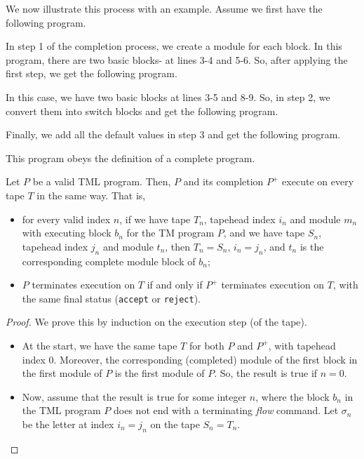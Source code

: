 \begin{appendices}
We now illustrate this process with an example. Assume we first have the following program.

In step 1 of the completion process, we create a module for each block. In this program, there are two basic blocks- at lines 3-4 and 5-6. So, after applying the first step, we get the following program.

In this case, we have two basic blocks at lines 3-5 and 8-9. So, in step 2, we convert them into switch blocks and get the following program.

Finally, we add all the default values in step 3 and get the following program.

This program obeys the definition of a complete program.

\begin{theorem} \label{thm:complete_TM}
    Let $P$ be a valid TML program. Then, $P$ and its completion $P^+$ execute on every tape $T$ in the same way. That is,
    \begin{itemize}
        \item for every valid index $n$, if we have tape $T_n$, tapehead index $i_n$ and module $m_n$ with executing block $b_n$ for the TM program $P$, and we have tape $S_n$, tapehead index $j_n$ and module $t_n$, then $T_n = S_n$, $i_n = j_n$, and $t_n$ is the corresponding complete module block of $b_n$;
        \item $P$ terminates execution on $T$ if and only if $P^+$ terminates execution on $T$, with the same final status (\texttt{accept} or \texttt{reject}).
    \end{itemize}
\end{theorem}
\begin{proof}
    We prove this by induction on the execution step (of the tape). 
    \begin{itemize}
        \item At the start, we have the same tape $T$ for both $P$ and $P^+$, with tapehead index 0. Moreover, the corresponding (completed) module of the first block in the first module of $P$ is the first module of $P$. So, the result is true if $n = 0$. 
        \item Now, assume that the result is true for some integer $n$, where the block $b_n$ in the TML program $P$ does not end with a terminating \textit{flow} command. Let $\sigma_n$ be the letter at index $i_n = j_n$ on the tape $S_n = T_n$.
        \begin{itemize}

\end{itemize}
\end{itemize}
\end{proof}
\end{appendices}
